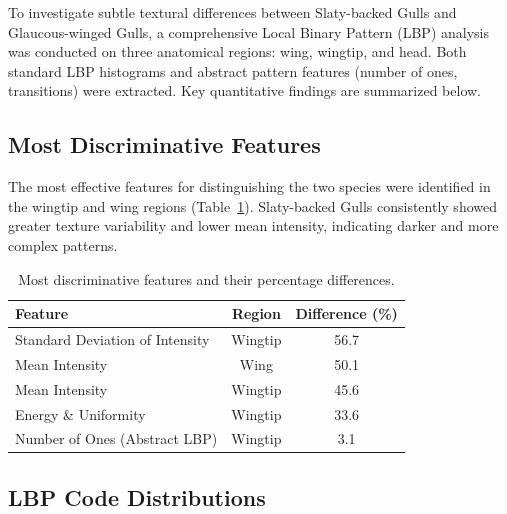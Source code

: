 \documentclass[a4paper,12pt]{report}
\begin{document}
To investigate subtle textural differences between Slaty-backed Gulls and Glaucous-winged Gulls, a comprehensive Local Binary Pattern (LBP) analysis was conducted on three anatomical regions: wing, wingtip, and head. Both standard LBP histograms and abstract pattern features (number of ones, transitions) were extracted. Key quantitative findings are summarized below.

\subsection{Most Discriminative Features}

The most effective features for distinguishing the two species were identified in the wingtip and wing regions (Table~\ref{tab:feature-diff}). Slaty-backed Gulls consistently showed greater texture variability and lower mean intensity, indicating darker and more complex patterns.


\begin{table}[H]
\centering
\caption{Most discriminative features and their percentage differences.}
\label{tab:feature-diff}
\begin{tabular}{lcc}
\hline
\textbf{Feature} & \textbf{Region} & \textbf{Difference (\%)} \\
\hline
Standard Deviation of Intensity & Wingtip & 56.7 \\
Mean Intensity & Wing & 50.1 \\
Mean Intensity & Wingtip & 45.6 \\
Energy \& Uniformity & Wingtip & 33.6 \\
Number of Ones (Abstract LBP) & Wingtip & 3.1 \\
\hline
\end{tabular}
\end{table}

\subsection{LBP Code Distributions}
\end{document}
